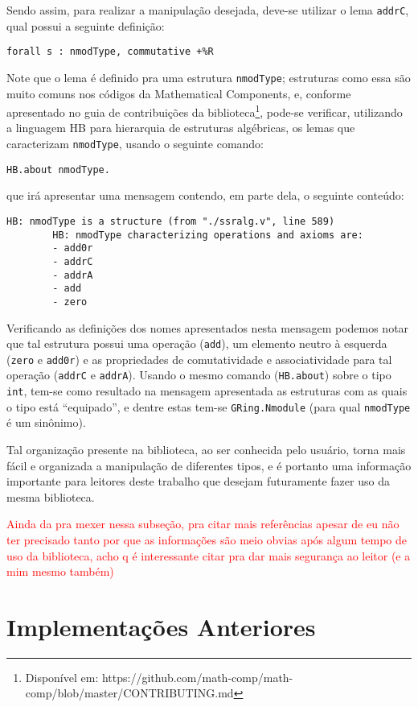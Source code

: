Sendo assim, para realizar a manipulação desejada, deve-se utilizar o lema \lstinline[language = coq]!addrC!, qual possui a seguinte definição: 
\begin{lstlisting}[language=coq]
        forall s : nmodType, commutative +%R
\end{lstlisting}
Note que o lema é definido pra uma estrutura \lstinline[language = coq]!nmodType!; estruturas como essa são muito comuns nos códigos da Mathematical Components, e, conforme apresentado no guia de contribuições da biblioteca\footnote{Disponível em: https://github.com/math-comp/math-comp/blob/master/CONTRIBUTING.md}, pode-se verificar, utilizando a linguagem HB \cite{cohen_et_al:LIPIcs.FSCD.2020.34} para hierarquia de estruturas algébricas, os lemas que caracterizam \lstinline[language = coq]!nmodType!, usando o seguinte comando: 
\begin{lstlisting}[language=coq]
        HB.about nmodType.
\end{lstlisting}
que irá apresentar uma mensagem contendo, em parte dela, o seguinte conteúdo:
\begin{lstlisting}[language=coq-error]
        HB: nmodType is a structure (from "./ssralg.v", line 589)
        HB: nmodType characterizing operations and axioms are:
        - add0r
        - addrC
        - addrA
        - add
        - zero
\end{lstlisting}
Verificando as definições dos nomes apresentados nesta mensagem podemos notar que tal estrutura possui uma operação (\lstinline[language = coq]!add!), um elemento neutro à esquerda (\lstinline[language = coq]!zero! e \lstinline[language = coq]!add0r!) e as propriedades de comutatividade e associatividade para tal operação (\lstinline[language = coq]!addrC! e \lstinline[language = coq]!addrA!).
Usando o mesmo comando (\lstinline[language = coq]!HB.about!) sobre o tipo \lstinline[language = coq]!int!, tem-se como resultado na mensagem apresentada as estruturas com as quais o tipo está ``equipado'', e dentre estas tem-se \lstinline[language = coq]!GRing.Nmodule! (para qual \lstinline[language=coq]!nmodType! é um sinônimo). 

Tal organização presente na biblioteca, ao ser conhecida pelo usuário, torna mais fácil e organizada a manipulação de diferentes tipos, e é portanto uma informação importante para leitores deste trabalho que desejam futuramente fazer uso da mesma biblioteca. 

\textcolor{red}{ Ainda da pra mexer nessa subseção, pra citar mais referências apesar de eu não ter precisado tanto por que as informações são meio obvias após algum tempo de uso da biblioteca, acho q é interessante citar pra dar mais segurança ao leitor (e a mim mesmo também)}

\section{Implementações Anteriores}